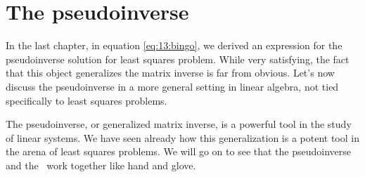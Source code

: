 \chapter{The pseudoinverse}
\label{chap:pseudoinverse}
In the last chapter, in equation \eqref{eq:13:bingo}, we derived an expression for the pseudoinverse solution for least squares problem. While very satisfying, the fact that this object generalizes the matrix inverse is far from obvious. Let's now discuss the pseudoinverse in a more general setting in linear algebra, not tied specifically to least squares problems.

The pseudoinverse, or generalized matrix inverse, is a powerful tool in the study of linear systems. We have seen already how this generalization is a potent tool in the arena of least squares problems. We will go on to see that the pseudoinverse and the \svdl \ work together like hand and glove.











\endinput